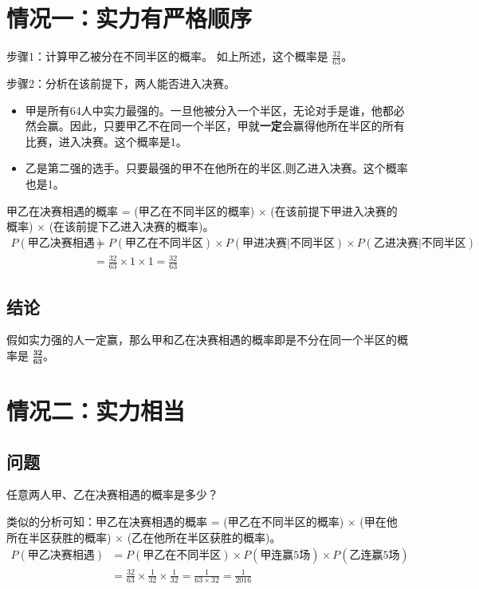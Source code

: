 \documentclass{article}
\begin{document}
\section{情况一：实力有严格顺序}
\begin{description}
    \item 步骤1：计算甲乙被分在不同半区的概率。
    如上所述，这个概率是 $\frac{32}{63}$。
    \item 步骤2：分析在该前提下，两人能否进入决赛。
    \begin{itemize}
        \item 甲是所有64人中实力最强的。一旦他被分入一个半区，无论对手是谁，他都必然会赢。因此，只要甲乙不在同一个半区，甲就\textbf{一定}会赢得他所在半区的所有比赛，进入决赛。这个概率是1。
        \item 乙是第二强的选手。只要最强的甲不在他所在的半区,则乙进入决赛。这个概率也是1。
    \end{itemize}
    
    \item[步骤3：合并概率。]
    甲乙在决赛相遇的概率 = (甲乙在不同半区的概率) × (在该前提下甲进入决赛的概率) × (在该前提下乙进入决赛的概率)。
    \begin{align*}
        P(\text{甲乙决赛相遇}) &= P(\text{甲乙在不同半区}) \times P(\text{甲进决赛} | \text{不同半区}) \times P(\text{乙进决赛} | \text{不同半区}) \\
        &= \frac{32}{63} \times 1 \times 1 = \frac{32}{63}
    \end{align*}
\end{description}

\subsection*{结论}
假如实力强的人一定赢，那么甲和乙在决赛相遇的概率即是不分在同一个半区的概率是 $\mathbf{\frac{32}{63}}$。

\section{情况二：实力相当}
\subsection*{问题}
任意两人甲、乙在决赛相遇的概率是多少？

类似的分析可知：甲乙在决赛相遇的概率 = (甲乙在不同半区的概率) × (甲在他所在半区获胜的概率) × (乙在他所在半区获胜的概率)。
    \begin{align*}
        P(\text{甲乙决赛相遇}) &= P(\text{甲乙在不同半区}) \times P(\text{甲连赢5场}) \times P(\text{乙连赢5场}) \\
        &= \frac{32}{63} \times \frac{1}{32} \times \frac{1}{32} = \frac{1}{63 \times 32} = \frac{1}{2016}
    \end{align*}
\end{document}
